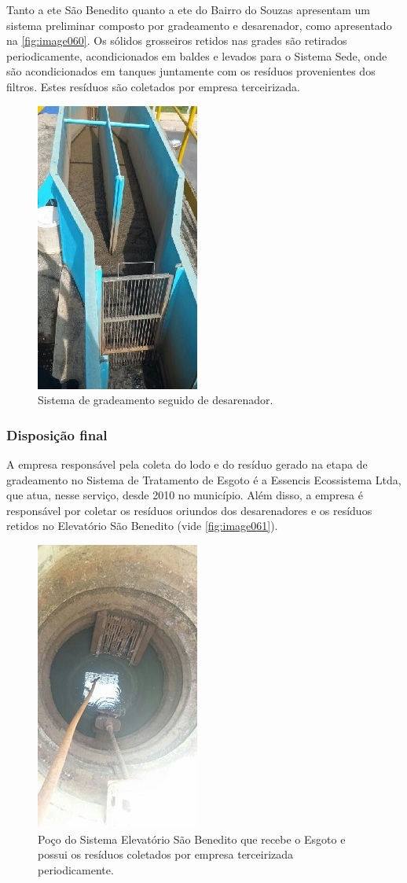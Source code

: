 	
	Tanto a \gls{ete} São Benedito quanto a \gls{ete} do Bairro do Souzas apresentam um sistema preliminar composto por gradeamento e desarenador, como apresentado na \autoref{fig:image060}. Os sólidos grosseiros retidos nas grades são retirados periodicamente, acondicionados em baldes e levados para o Sistema Sede, onde são acondicionados em tanques juntamente com os resíduos provenientes dos filtros. Estes resíduos são coletados por empresa terceirizada.
	
	\begin{figure}
		\centering
		\includegraphics[width=0.25\linewidth]{produtos/prodtres/image060}
		\caption{Sistema de gradeamento seguido de desarenador.}
		\label{fig:image060}
	\end{figure}
	
	
	\subsubsection{Disposição final}
	
	A empresa responsável pela coleta do lodo e do resíduo gerado na etapa de gradeamento no Sistema de Tratamento de Esgoto é a Essencis Ecossistema Ltda, que atua, nesse serviço, desde 2010 no município. Além disso, a empresa é responsável por coletar os resíduos oriundos dos desarenadores e os resíduos retidos no Elevatório São Benedito (vide \autoref{fig:image061}). 
	
	\begin{figure}
		\centering
		\includegraphics[width=0.25\linewidth]{produtos/prodtres/image061}
		\caption{Poço do Sistema Elevatório São Benedito que recebe o Esgoto e possui os resíduos coletados por empresa terceirizada periodicamente.}
		\label{fig:image061}
	\end{figure}
	
